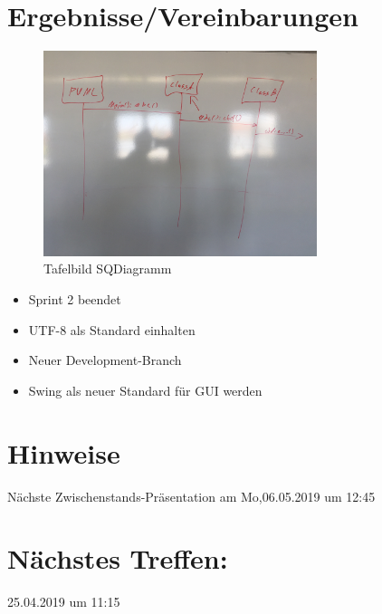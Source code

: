 \section{Ergebnisse/Vereinbarungen}
\begin{figure}
	\centering
	\includegraphics[width=8cm]{bilderMinutes/sequenceDiagrammFkt_Tafel}
	\caption{Tafelbild SQDiagramm}
\end{figure}
\begin{itemize}
\item Sprint 2 beendet\\
\item UTF-8 als Standard einhalten\\
\item Neuer Development-Branch \\
\item Swing als neuer Standard für GUI werden\\
\end{itemize}
\section{Hinweise}
Nächste Zwischenstands-Präsentation am Mo,06.05.2019 um 12:45
\section*{Nächstes Treffen:}
25.04.2019 um 11:15